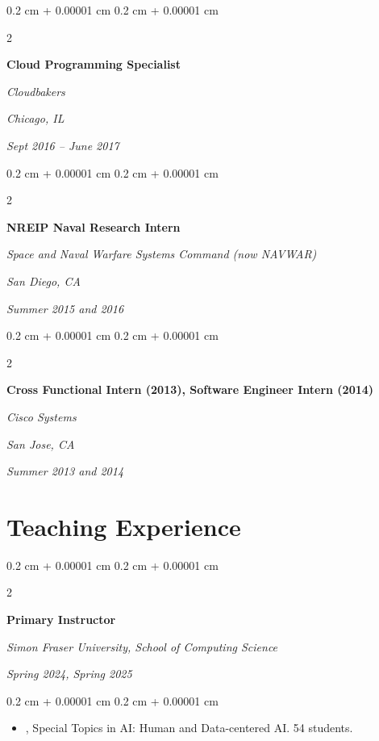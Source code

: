 \documentclass[10pt, letterpaper]{article}
\newenvironment{highlights}{
    \begin{itemize}[
        topsep=0.10 cm,
        parsep=0.10 cm,
        partopsep=0pt,
        itemsep=0pt,
        leftmargin=0.4 cm + 10pt
    ]
}{
    \end{itemize}
} %
\newenvironment{onecolentry}{
    \begin{adjustwidth}{
        0.2 cm + 0.00001 cm
    }{
        0.2 cm + 0.00001 cm
    }
}{
    \end{adjustwidth}
} %
\newenvironment{twocolentry}[2][]{
    \onecolentry
    \def\secondColumn{#2}
    \setcolumnwidth{\fill, 4.1 cm}
    \begin{paracol}{2}
}{
    \switchcolumn \raggedleft \secondColumn
    \end{paracol}
    \endonecolentry
} %
\let\hrefWithoutArrow\href
\renewcommand{\href}[2]{\hrefWithoutArrow{#1}{\ifthenelse{\equal{#2}{}}{ }{#2 }\raisebox{.15ex}{\footnotesize \faExternalLink*}}}
\begin{document}
        \begin{twocolentry}{
        \textit{Chicago, IL}    
            
        \textit{Sept 2016 – June 2017}}
            \textbf{Cloud Programming Specialist}
            
            \textit{Cloudbakers}
        \end{twocolentry}



        \vspace{0.2 cm}

        \begin{twocolentry}{
        \textit{San Diego, CA}    
            
        \textit{Summer 2015 and 2016}}
            \textbf{NREIP Naval Research Intern}
            
            \textit{Space and Naval Warfare Systems Command (now NAVWAR)}
        \end{twocolentry}



        \vspace{0.2 cm}

        \begin{twocolentry}{
        \textit{San Jose, CA}    
            
        \textit{Summer 2013 and 2014}}
            \textbf{Cross Functional Intern (2013), Software Engineer Intern (2014)}
            
            \textit{Cisco Systems}
        \end{twocolentry}




    
    \section{Teaching Experience}



        
        \begin{twocolentry}{
            
            
        \textit{Spring 2024, Spring 2025}}
            \textbf{Primary Instructor}
            
            \textit{Simon Fraser University, School of Computing Science}
        \end{twocolentry}

        \vspace{0.10 cm}
        \begin{onecolentry}
            \begin{highlights}
                \item \href{http://www.sfu.ca/outlines.html?2024/spring/cmpt/419/e200}{CMPT 419}, Special Topics in AI: Human and Data-centered AI. 54 students.
            \end{highlights}
        \end{onecolentry}
\end{document}
